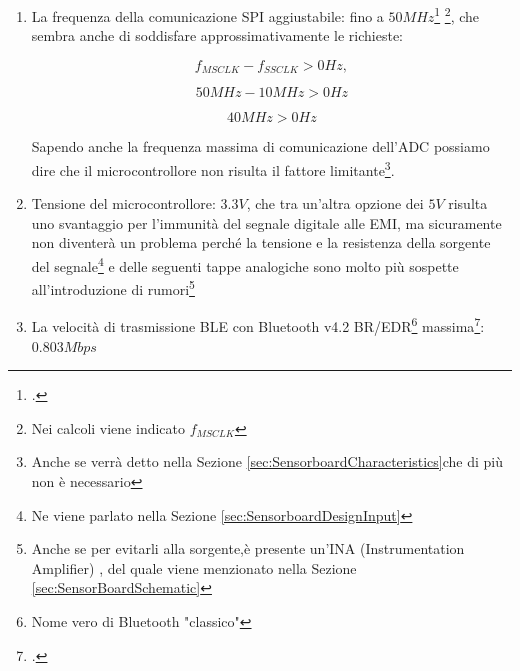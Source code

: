 \documentclass[a4paper, 10pt, final]{article} %
\newcommand{\parenciteit}[2]{\textit{\parencite[#1]{#2}}} %
\begin{document}
\begin{enumerate}[label=\emph{(\arabic*)}]
            \label{est:ControllerSpeed}
        \item La frequenza della comunicazione SPI aggiustabile: fino a $50MHz$\footcite[Sezione 4.1.9]{ESP32:Datasheet} \footnote{Nei calcoli viene indicato $f_{MSCLK}$}, che sembra anche di soddisfare approssimativamente le richieste:
            \begin{figure}[H]
                \centering
                \begin{minipage}[b]{.3\linewidth}
                    \centering
                    \[
                        f_{MSCLK} - f_{SSCLK} > 0Hz \mathrm{,}
                    \]
                \end{minipage}
                \begin{minipage}[b]{.3\linewidth}
                    \centering
                    \[
                        50MHz - 10MHz > 0Hz
                    \]
                \end{minipage}
                \begin{minipage}[b]{.3\linewidth}
                    \centering
                    \[
                        40MHz > 0Hz
                    \]
                \end{minipage}
            \end{figure}
            \noindent Sapendo anche la frequenza massima di comunicazione dell'ADC possiamo dire che il microcontrollore non risulta il fattore limitante\footnote{Anche se verr\`{a} detto nella Sezione \ref{sec:SensorboardCharacteristics}che di pi\`{u} non \`{e} necessario}. 
        \item Tensione del microcontrollore: $3.3V$, che tra un'altra opzione dei $5V$ risulta uno svantaggio per l'immunit\`{a} del segnale digitale alle EMI, ma sicuramente non diventer\`{a} un problema perch\'{e} la tensione e la resistenza della sorgente del segnale\footnote{Ne viene parlato nella Sezione \ref{sec:SensorboardDesignInput}} e delle seguenti tappe analogiche sono molto pi\`{u} sospette all'introduzione di rumori\footnote{Anche se per evitarli alla sorgente,\`{e} presente un'INA (Instrumentation Amplifier) \parenciteit{}{INA:Wiki}, del quale viene menzionato nella Sezione \ref{sec:SensorBoardSchematic}} 
        \item La velocit\`{a} di trasmissione BLE con Bluetooth v4.2 BR/EDR\footnote{Nome vero di Bluetooth "classico"} massima\footcite[]{BLEThroughput:Wiki}: $0.803Mbps$

\end{enumerate}
\end{document}
